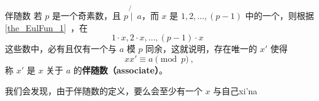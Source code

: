 
\begin{definition}{伴随数}
若 $p$ 是一个奇素数，且 $p \not{\mid}~ a$，而 $x$ 是 $1, 2, \dots, (p-1)$ 中的一个，则根据\autoref{the_EulFun_1}~，在
\begin{equation}
1 \cdot x, 2 \cdot x, \dots, (p-1)\cdot x ~~
\end{equation}
这些数中，必有且仅有一个与 $a$ 模 $p$ 同余，这就说明，存在唯一的 $x'$ 使得
\begin{equation}
x x' \equiv a \pmod p ~,
\end{equation}
称 $x'$ 是 $x$ 关于 $a$ 的\textbf{伴随数（associate）}。
\end{definition}
我们会发现，由于伴随数的定义，要么会至少有一个 $x$ 与自己xi'na

